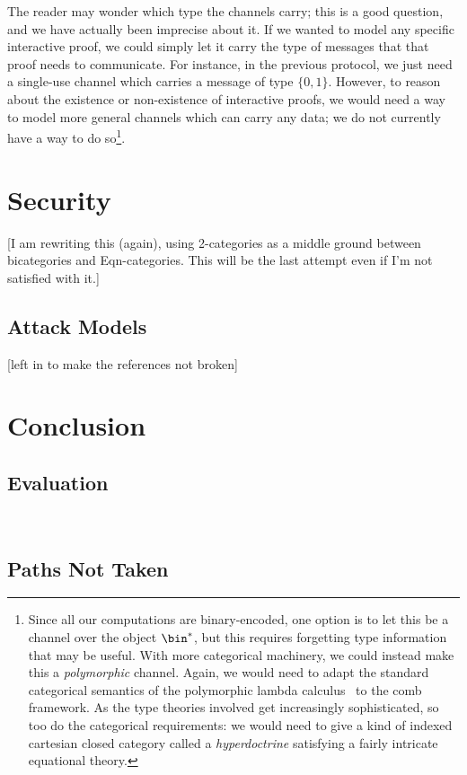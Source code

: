 The reader may wonder which type the channels carry; this is a good question,
and we have actually been imprecise about it. If we wanted to model any specific
interactive proof, we could simply let it carry the type of messages that that
proof needs to communicate. For instance, in the previous protocol, we just need
a single-use channel which carries a message of type $\{0, 1\}$.
However, to reason about the existence or non-existence of interactive proofs,
we would need a way to model more general channels which can carry any data; we
do not currently have a way to do so\footnote{
  Since all our computations are binary-encoded, one option is to let this be a
  channel over the object $\bin^*$, but this requires forgetting type information
  that may be useful. With more categorical machinery, we could instead make this
  a \emph{polymorphic} channel. Again, we would need to adapt the standard
  categorical semantics of the polymorphic lambda calculus~\cite{seely-1987} to
  the comb framework. As the type theories involved get increasingly
  sophisticated, so too do the categorical requirements: we would need to give a
  kind of indexed cartesian closed category called a \emph{hyperdoctrine}
  satisfying a fairly intricate equational theory.
}.



\section{Security}
\label{sec:security}

[I am rewriting this (again), using 2-categories as a middle
ground between bicategories and Eqn-categories. This will be the last attempt
even if I'm not satisfied with it.]

\subsection{Attack Models}
\label{sec:attack-models}

[left in to make the references not broken]

\section{Conclusion}
\subsection{Evaluation}
\

\subsection{Paths Not Taken}


